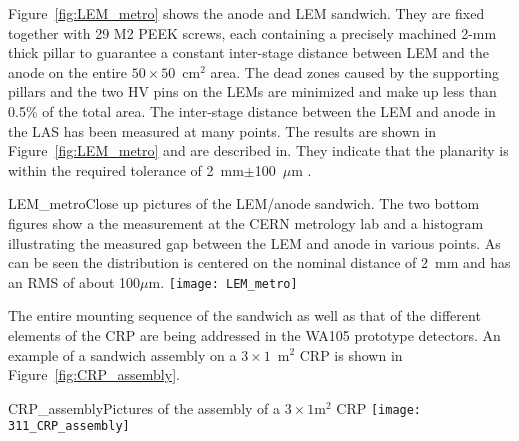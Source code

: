 Figure~\ref{fig:LEM_metro} shows the anode and LEM sandwich.  They are
fixed together with 29 M2 PEEK screws, each containing a precisely
machined 2-mm thick pillar to guarantee a constant inter-stage
distance between LEM and the anode on the entire $50\times50$~cm$^2$
area.  The dead zones caused by the supporting pillars and the two HV
pins on the LEMs are minimized and make up less than 0.5\% of the
total area. The inter-stage distance between the LEM and anode in the
LAS has been measured at many points. The results are shown in
Figure~\ref{fig:LEM_metro} and are described
in\cite{EDMS_metro_lem_anode}. They indicate that the planarity is
within the required tolerance of 2~mm$\pm$100~$\mu$m .
\begin{cdrfigure}{LEM_metro}{Close up pictures of the LEM/anode sandwich. The two
       bottom figures show a the measurement at the CERN metrology lab
       and a histogram illustrating the measured gap between the LEM
       and anode in various points. As can be seen the distribution is
       centered on the nominal distance of 2~mm and has an RMS of
       about 100$\mu$m.}
     \texttt{[image: LEM\_metro]}
\end{cdrfigure}

The entire mounting sequence of the sandwich as well as that of the
different elements of the CRP are being addressed in the WA105
prototype detectors. An example of a sandwich assembly on a
$3\times1$~m$^2$ CRP is shown in Figure~\ref{fig:CRP_assembly}.
\begin{cdrfigure}{CRP_assembly}{Pictures of the assembly of a $3\times1$m$^2$ CRP}
     \texttt{[image: 311\_CRP\_assembly]}  
\end{cdrfigure}
